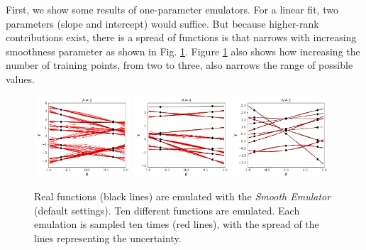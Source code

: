 \documentclass[UserManual.tex]{subfiles}
\begin{document}
First, we show some results of one-parameter emulators. For a linear fit, two parameters (slope and intercept) would suffice. But because higher-rank contributions exist, there is a spread of functions is that narrows with increasing smoothness parameter as shown in Fig. \ref{fig:onedim}. Figure \ref{fig:onedim} also shows how increasing the number of training points, from two to three, also narrows the range of possible values. 
\begin{figure}
\includegraphics[width=0.32\textwidth]{onepar2points/onepartest_Lambda2}\hspace*{0.02\textwidth}
\includegraphics[width=0.32\textwidth]{onepar2points/onepartest_Lambda4}\hspace*{0.02\textwidth}
\includegraphics[width=0.32\textwidth]{onepar3points/onepartest_Lambda2}
\caption{\label{fig:onedim}
Real functions (black lines) are emulated with the {\it Smooth Emulator} (default settings). Ten different functions are emulated. Each emulation is sampled ten times (red lines), with the spread of the lines representing the uncertainty.}
\end{figure}
\end{document}
